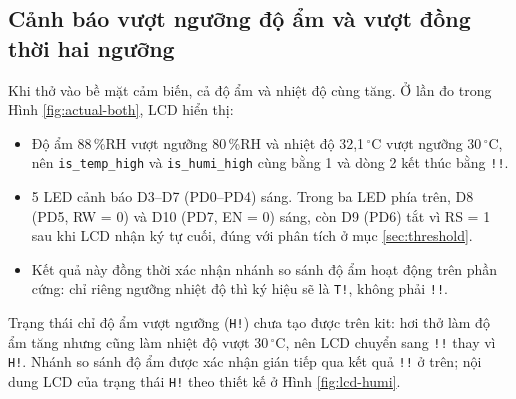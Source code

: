 \subsection{Cảnh báo vượt ngưỡng độ ẩm và vượt đồng thời hai ngưỡng}
Khi thở vào bề mặt cảm biến, cả độ ẩm và nhiệt độ cùng tăng. Ở lần đo trong Hình \ref{fig:actual-both}, LCD hiển thị:
\begin{itemize}[leftmargin=1.2cm]
    \item Độ ẩm 88\,\%RH vượt ngưỡng 80\,\%RH và nhiệt độ 32,1\,$^\circ$C vượt ngưỡng 30\,$^\circ$C, nên \texttt{is\_temp\_high} và \texttt{is\_humi\_high} cùng bằng 1 và dòng 2 kết thúc bằng \texttt{!!}.
    \item 5 LED cảnh báo D3--D7 (PD0--PD4) sáng. Trong ba LED phía trên, D8 (PD5, RW = 0) và D10 (PD7, EN = 0) sáng, còn D9 (PD6) tắt vì RS = 1 sau khi LCD nhận ký tự cuối, đúng với phân tích ở mục \ref{sec:threshold}.
    \item Kết quả này đồng thời xác nhận nhánh so sánh độ ẩm hoạt động trên phần cứng: chỉ riêng ngưỡng nhiệt độ thì ký hiệu sẽ là \texttt{T!}, không phải \texttt{!!}.
\end{itemize}
Trạng thái chỉ độ ẩm vượt ngưỡng (\texttt{H!}) chưa tạo được trên kit: hơi thở làm độ ẩm tăng nhưng cũng làm nhiệt độ vượt 30\,$^\circ$C, nên LCD chuyển sang \texttt{!!} thay vì \texttt{H!}. Nhánh so sánh độ ẩm được xác nhận gián tiếp qua kết quả \texttt{!!} ở trên; nội dung LCD của trạng thái \texttt{H!} theo thiết kế ở Hình \ref{fig:lcd-humi}.

